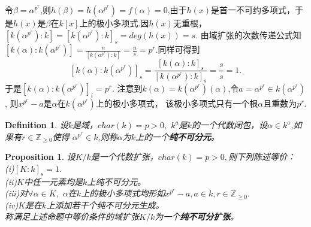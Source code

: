 \documentclass[UTF8]{article}
\newtheorem{defn}{Definition}[section]
\newtheorem{prop}{Proposition}[section]
\begin{document}
令$\beta=\alpha^{p^{r}}$,则$h(\beta)=h(\alpha^{p^{r}})=f(\alpha)=0$,由于$h(x)$是首一不可约多项式，于是$h(x)$是$\beta$在$k[x]$上的极小多项式.因$h(x)$无重根，
$[k(\alpha^{p^{r}}):k]=[k(\alpha^{p^{r}}):k]_{s}=deg(h(x))=s.$
由域扩张的次数传递公式知$[k(\alpha):k(\alpha^{p^{r}})]=\frac{n}{[k(\alpha^{p^{r}}):k]}=\frac{n}{s}=p^{r}.$同样可得到
$$  
[k(\alpha):k(\alpha^{p^{r}})]_{s}=\frac{[k(\alpha):k]_{s}}{[k(\alpha^{p^{r}}):k]_{s}}=\frac{s}{s}=1.	
$$
于是$[k(\alpha):k(\alpha^{p^{r}})]_{i}=p^{r}.$
注意到$k(\alpha)=k(\alpha^{p^{r}})(\alpha)$,令$a=\alpha^{p^{r}}\in k(\alpha^{p^{r}})$,
则$x^{p^{r}}-a$是$\alpha$在$k(\alpha^{p^{r}})$上的极小多项式，
该极小多项式只有一个根$\alpha$且重数为$p^{r}.$\\
\begin{defn}
设$k$是域，$char(k)=p>0,$ $k^{a}$是$k$的一个代数闭包，设$\alpha\in k^{a}$,如果有$r\in \mathbb{Z}_{\geq 0}$使得
$\alpha^{p^{r}}\in k$,则称$\alpha$为$k$上的一个\textbf{纯不可分元}。
\end{defn}
\begin{prop}
设$K/k$是一个代数扩张，$char(k)=p>0,$则下列陈述等价：\\
(i)$[K:k]_{s}=1.$\\
(ii)$K$中任一元素均是$k$上纯不可分元。\\
(iii)对$\forall \alpha \in K,$  $\alpha$在$k$上的极小多项式均形如$x^{p^{r}}-a,a\in k,r\in \mathbb{Z}_{\geq 0}.$\\
(iv)$K$是在$k$上添加若干个纯不可分元生成。\\
称满足上述命题中等价条件的域扩张$K/k$为一个\textbf{纯不可分扩张}。
\end{prop}
\end{document}
